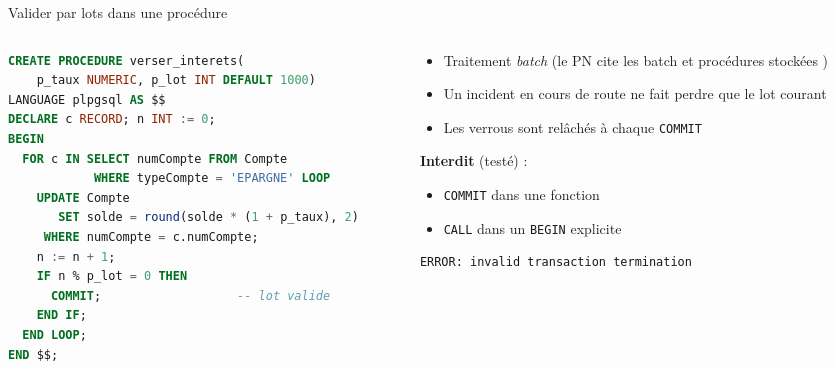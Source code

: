 \documentclass[aspectratio=169,10pt]{beamer}
\begin{document}
\begin{frame}[fragile]{Valider par lots dans une proc\'edure}
  \begin{columns}[T]
    \begin{column}{0.55\textwidth}
\begin{lstlisting}[language=SQL,basicstyle=\lstcode\scriptsize]
CREATE PROCEDURE verser_interets(
    p_taux NUMERIC, p_lot INT DEFAULT 1000)
LANGUAGE plpgsql AS $$
DECLARE c RECORD; n INT := 0;
BEGIN
  FOR c IN SELECT numCompte FROM Compte
            WHERE typeCompte = 'EPARGNE' LOOP
    UPDATE Compte
       SET solde = round(solde * (1 + p_taux), 2)
     WHERE numCompte = c.numCompte;
    n := n + 1;
    IF n % p_lot = 0 THEN
      COMMIT;                   -- lot valide
    END IF;
  END LOOP;
END $$;
\end{lstlisting}
    \end{column}
    \begin{column}{0.42\textwidth}
      \begin{itemize}
        \item Traitement \textit{batch} (le PN cite les \og batch et proc\'edures stock\'ees \fg{})
        \item Un incident en cours de route ne fait perdre que le lot courant
        \item Les verrous sont rel\^ach\'es \`a chaque \texttt{COMMIT}
      \end{itemize}
      \vspace{1mm}
      \textbf{Interdit} (test\'e) :
      \begin{itemize}
        \item \texttt{COMMIT} dans une fonction
        \item \texttt{CALL} dans un \texttt{BEGIN} explicite
      \end{itemize}
\begin{lstlisting}[style=out]
ERROR: invalid transaction termination
\end{lstlisting}
    \end{column}
  \end{columns}
\end{frame}
\end{document}
